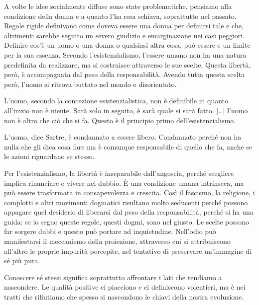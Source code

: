 \documentclass[12pt]{book} %
\begin{document}
A volte le idee socialmente diffuse sono state problematiche, pensiamo alla condizione della donna e a quanto l'ha resa schiava,
soprattutto nel passato. Regole rigide definivano come doveva essere una donna per definirsi tale e che, altrimenti sarebbe seguito un severo giudizio e emarginazione nei casi peggiori. Definire cos'è un uomo o una donna o qualsiasi altra cosa, può essere e un limite per
la sua essenza. Secondo l’esistenzialismo, l’essere umano non ha una natura predefinita da realizzare, ma si costruisce attraverso le sue scelte. Questa libertà, però, è accompagnata dal peso della responsabilità. Avendo tutta questa scelta però, l'uomo
si ritrova buttato nel mondo e disorientato.

L'uomo, secondo la concezione esistenzialistica, non è definibile in quanto all'inizio non è niente. Sarà solo in
seguito, è sarà quale si sarà fatto. […] l'uomo non è altro che ciò che si fa. Questo è il principio primo
dell'esistenzialismo.

L'uomo, dice Sartre, è condannato a essere libero. Condannato perché non ha nulla che gli dica cosa fare ma è comunque
responsabile di quello che fa, anche se le azioni riguardano se stesso.

Per l’esistenzialismo, la libertà è inseparabile dall’angoscia, perché scegliere implica rinunciare e vivere nel dubbio. È una condizione umana intrinseca, ma può essere trasformata in consapevolezza e crescita. Così il fascismo, la religione, i complotti e
altri movimenti dogmatici risultano molto seducenti perché possono appagare quel desiderio di liberarsi dal peso della
responsabilità, perché si ha una guida: se io seguo queste regole, questi dogmi, sono nel giusto. Le scelte
possono far sorgere dubbi e questo può portare ad inquietudine. Nell'odio può manifestarsi il meccanismo della proiezione, attraverso cui si attribuiscono all'altro le proprie impurità percepite, nel tentativo di preservare un'immagine di sé più pura.

Conoscere sé stessi significa soprattutto affrontare i lati che tendiamo a nascondere. Le qualità positive ci piacciono e ci definiscono volentieri, ma è nei tratti che rifiutiamo che spesso si nascondono le chiavi della nostra evoluzione.
\end{document}
